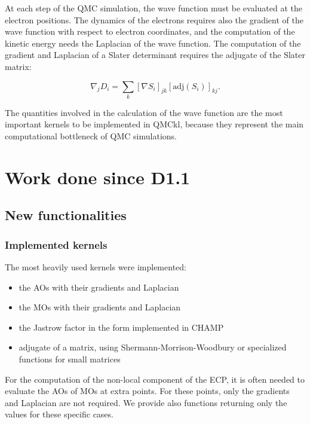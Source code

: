 At each step of the \ac{QMC} simulation, the wave function must be
evaluated at the electron positions. The dynamics of the electrons
requires also the gradient of the wave function with respect to electron
coordinates, and the computation of the kinetic energy needs the Laplacian
of the wave function. The computation of the gradient and Laplacian of
a Slater determinant requires the adjugate of the Slater matrix:

\begin{equation}
  \nabla_j D_i = \sum_k \left[\nabla S_i \right]_{jk} \left[\mathrm{adj}(S_i)\right]_{kj}.
\end{equation}


The quantities involved in the calculation of the wave function are the most
important kernels to be implemented in QMCkl, because they represent the main
computational bottleneck of \ac{QMC} simulations.


\section{Work done since D1.1}

\subsection{New functionalities}

\subsubsection{Implemented kernels}

The most heavily used kernels were implemented:
\begin{itemize}
  \item the \acp{AO} with their gradients and Laplacian
  \item the \acp{MO} with their gradients and Laplacian
  \item the Jastrow factor in the form implemented in CHAMP
  \item adjugate of a matrix, using Shermann-Morrison-Woodbury or
    specialized functions for small matrices
\end{itemize}    

For the computation of the non-local component of the
\ac{ECP}, it is often needed to evaluate the \acp{AO} of
\acp{MO} at extra points. For these points, only the gradients and
Laplacian are not required. We provide also functions returning only
the values for these specific cases.


